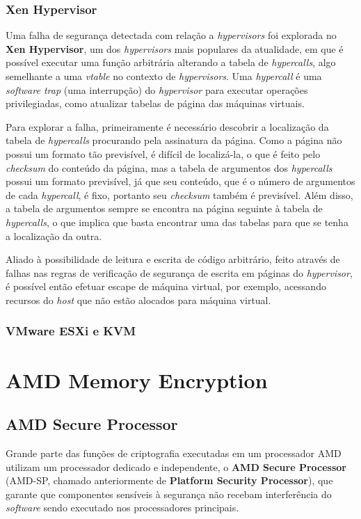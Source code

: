 \documentclass{report}
\begin{document}
\subsection{Xen Hypervisor}

Uma falha de segurança detectada com relação a \textit{hypervisors} foi
explorada no \textbf{Xen Hypervisor}, um dos \textit{hypervisors} mais
populares da atualidade, em que é possível executar uma função arbitrária
alterando a tabela de \textit{hypercalls}, algo semelhante a uma
\textit{vtable} no contexto de \textit{hypervisors}. Uma \textit{hypercall} é
uma \textit{software trap} (uma interrupção) do \textit{hypervisor} para
executar operações privilegiadas, como atualizar tabelas de página das máquinas
virtuais.

Para explorar a falha, primeiramente é necessário descobrir a localização da
tabela de \textit{hypercalls} procurando pela assinatura da página. Como a
página não possui um formato tão previsível, é difícil de localizá-la, o que é
feito pelo \textit{checksum} do conteúdo da página, mas a tabela de argumentos
dos \textit{hypercalls} possui um formato previsível, já que seu conteúdo, que
é o número de argumentos de cada \textit{hypercall}, é fixo, portanto seu
\textit{checksum} também é previsível. Além disso, a tabela de argumentos
sempre se encontra na página seguinte à tabela de \textit{hypercalls}, o que
implica que basta encontrar uma das tabelas para que se tenha a localização da
outra.

Aliado à possibilidade de leitura e escrita de código arbitrário, feito através
de falhas nas regras de verificação de segurança de escrita em páginas do
\textit{hypervisor}, é possível então efetuar escape de máquina virtual, por
exemplo, acessando recursos do \textit{host} que não estão alocados para
máquina virtual.

\subsection{VMware ESXi e KVM}

\chapter{AMD Memory Encryption}

\section{AMD Secure Processor}

Grande parte das funções de criptografia executadas em um processador AMD
utilizam um processador dedicado e independente, o \textbf{AMD Secure
Processor} (AMD-SP, chamado anteriormente de \textbf{Platform Security
Processor}), que garante que componentes sensíveis à segurança não recebam
interferência do \textit{software} sendo executado nos processadores
principais.
\end{document}
